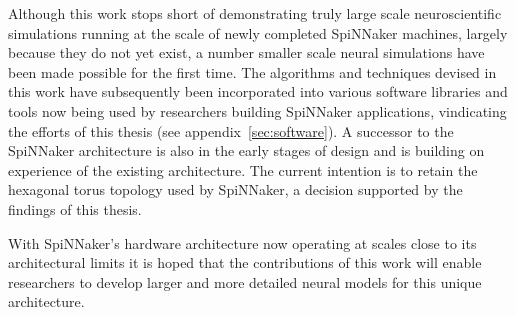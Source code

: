 		
		Although this work stops short of demonstrating truly large scale
		neuroscientific simulations running at the scale of newly completed
		SpiNNaker machines, largely because they do not yet exist, a number smaller
		scale neural simulations have been made possible for the first time. The
		algorithms and techniques devised in this work have subsequently been
		incorporated into various software libraries and tools now being used by
		researchers building SpiNNaker applications, vindicating the efforts of
		this thesis (see appendix~\ref{sec:software}). A successor to the SpiNNaker
		architecture is also in the early stages of design and is building on
		experience of the existing architecture. The current intention is to retain
		the hexagonal torus topology used by SpiNNaker, a decision supported by the
		findings of this thesis.
		
		With SpiNNaker's hardware architecture now operating at scales close to its
		architectural limits it is hoped that the contributions of this work will
		enable researchers to develop larger and more detailed neural models for
		this unique architecture.
